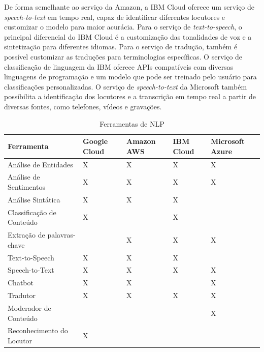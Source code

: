 \documentclass{article}
\begin{document}
 De forma semelhante ao serviço da Amazon, a IBM Cloud oferece um serviço de \textit{speech-to-text} em tempo real, capaz de identificar diferentes locutores e customizar o modelo para maior acurácia. Para o serviço de \textit{text-to-speech}, o principal diferencial do IBM Cloud é a customização das tonalidades de voz e a sintetização para diferentes idiomas. Para o serviço de tradução, também é possível customizar as traduções para terminologias específicas. O serviço de classificação de linguagem da IBM oferece APIs compatíveis com diversas linguagens de programação e um modelo que pode ser treinado pelo usuário para classificações personalizadas. O serviço de \textit{speech-to-text} da Microsoft também possibilita a identificação dos locutores e a transcrição em tempo real a partir de diversas fontes, como telefones, vídeos e gravações.

\begin{table}[!!ht]
 \caption{Ferramentas de NLP}
  \centering
  \begin{tabular}{lllll}
  \toprule
    \cmidrule(r){1-5}
    Ferramenta & Google Cloud & Amazon AWS & IBM Cloud & Microsoft Azure \\
    \midrule
    Análise de Entidades & X & X & X & X  \\
    Análise de Sentimentos & X & X & X & X   \\
    Análise Sintática & X & X & X & \\
    Classificação de Conteúdo & X & & X & \\
    Extração de palavras-chave & & X & X & X \\
    Text-to-Speech & X & X & X &\\
    Speech-to-Text & X & X & X & X \\
    Chatbot & X & X & & X \\
    Tradutor & X & X & X & X \\
    Moderador de Conteúdo & & & & X \\
    Reconhecimento do Locutor & X & & & \\
    \bottomrule
  \end{tabular}
  \label{tab:table1}
\end{table}
\end{document}
